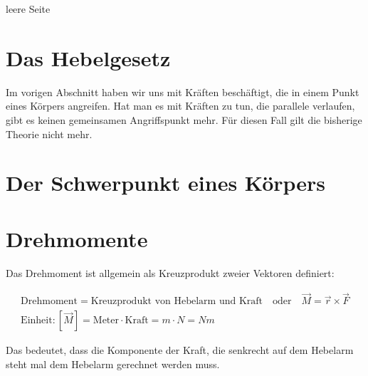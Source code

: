 \documentclass[12pt,a4paper,twoside]{article}
\def\dir{./Aufgaben_Mechanik/}
\newcommand{\Einbinden}[1]{}
\begin{document}
\newpage
leere Seite
\newpage
\section*{Das Hebelgesetz}
Im vorigen Abschnitt haben wir uns mit Kräften beschäftigt, die in einem Punkt eines Körpers angreifen.
Hat man es mit Kräften zu tun, die parallele verlaufen, gibt es keinen gemeinsamen Angriffspunkt mehr. 
Für diesen Fall gilt die bisherige Theorie nicht mehr.

\Einbinden{\dir/drehmomente01.tex}
\Einbinden{\dir/drehmomente03.tex}%
\Einbinden{\dir/drehmomente05.tex}%


\section*{Der Schwerpunkt eines Körpers}
\Einbinden{\dir/schwerpunkt01.tex}%
\Einbinden{\dir/schwerpunkt02.tex}%


\section*{Drehmomente}
Das Drehmoment ist allgemein als Kreuzprodukt zweier Vektoren definiert:

\begin{cbox}
\begin{gather*}
	\text{Drehmoment} = \text{Kreuzprodukt von Hebelarm und Kraft} \quad\text{oder}\quad \vec{M} = \vec{r}\times\vec{F}\\
	\text{Einheit}: [\vec{M}]=\text{Meter}\cdot\text{Kraft}=\si{m}\cdot\si{N}=\si{Nm}
\end{gather*}
\end{cbox}

Das bedeutet, dass die Komponente der Kraft, die senkrecht auf dem Hebelarm steht mal dem Hebelarm gerechnet werden muss.
\end{document}
